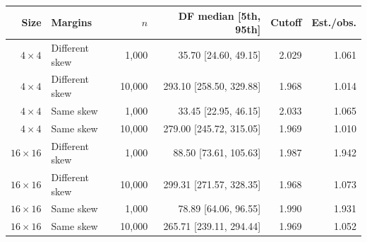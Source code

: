 \begin{tabular}{@{}rlrrrr@{}}\toprule
Size & Margins & \(n\) & DF median [5th, 95th] & Cutoff & Est./obs.\\\midrule
\(4\times4\) & Different skew & 1,000 & 35.70 [24.60, 49.15] & 2.029 & 1.061\\
\(4\times4\) & Different skew & 10,000 & 293.10 [258.50, 329.88] & 1.968 & 1.014\\
\(4\times4\) & Same skew & 1,000 & 33.45 [22.95, 46.15] & 2.033 & 1.065\\
\(4\times4\) & Same skew & 10,000 & 279.00 [245.72, 315.05] & 1.969 & 1.010\\
\(16\times16\) & Different skew & 1,000 & 88.50 [73.61, 105.63] & 1.987 & 1.942\\
\(16\times16\) & Different skew & 10,000 & 299.31 [271.57, 328.35] & 1.968 & 1.073\\
\(16\times16\) & Same skew & 1,000 & 78.89 [64.06, 96.55] & 1.990 & 1.931\\
\(16\times16\) & Same skew & 10,000 & 265.71 [239.11, 294.44] & 1.969 & 1.052\\
\bottomrule\end{tabular}
